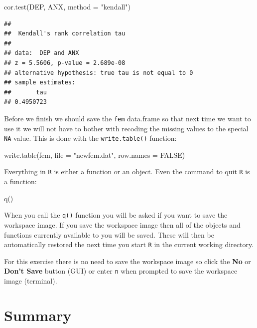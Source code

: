 \documentclass[
  12pt,
]{book}
\newenvironment{Shaded}{\begin{snugshade}}{\end{snugshade}}
\newcommand{\AttributeTok}[1]{\textcolor[rgb]{0.77,0.63,0.00}{#1}}
\newcommand{\ConstantTok}[1]{\textcolor[rgb]{0.00,0.00,0.00}{#1}}
\newcommand{\FunctionTok}[1]{\textcolor[rgb]{0.00,0.00,0.00}{#1}}
\newcommand{\NormalTok}[1]{#1}
\newcommand{\StringTok}[1]{\textcolor[rgb]{0.31,0.60,0.02}{#1}}
\begin{document}
\begin{Shaded}
\begin{Highlighting}[]
\FunctionTok{cor.test}\NormalTok{(DEP, ANX, }\AttributeTok{method =} \StringTok{"kendall"}\NormalTok{)}
\end{Highlighting}
\end{Shaded}

\begin{verbatim}
## 
##  Kendall's rank correlation tau
## 
## data:  DEP and ANX
## z = 5.5606, p-value = 2.689e-08
## alternative hypothesis: true tau is not equal to 0
## sample estimates:
##       tau 
## 0.4950723
\end{verbatim}

Before we finish we should save the \texttt{fem} data.frame so that next time we want to use it we will not have to bother with recoding the missing values to the special \texttt{NA} value. This is done with the \texttt{write.table()} function:

\begin{Shaded}
\begin{Highlighting}[]
\FunctionTok{write.table}\NormalTok{(fem, }\AttributeTok{file =} \StringTok{"newfem.dat"}\NormalTok{, }\AttributeTok{row.names =} \ConstantTok{FALSE}\NormalTok{)}
\end{Highlighting}
\end{Shaded}

Everything in \texttt{R} is either a function or an object. Even the command to quit \texttt{R} is a function:

\begin{Shaded}
\begin{Highlighting}[]
\FunctionTok{q}\NormalTok{()}
\end{Highlighting}
\end{Shaded}

When you call the \texttt{q()} function you will be asked if you want to save the workspace image. If you save the workspace image then all of the objects and functions currently available to you will be saved. These will then be automatically restored the next time you start \texttt{R} in the current working directory.

For this exercise there is no need to save the workspace image so click the \textbf{No} or \textbf{Don't Save} button (GUI) or enter \texttt{n} when prompted to save the workspace image (terminal).

\hypertarget{summary}{%
\section{Summary}\label{summary}}
\end{document}
